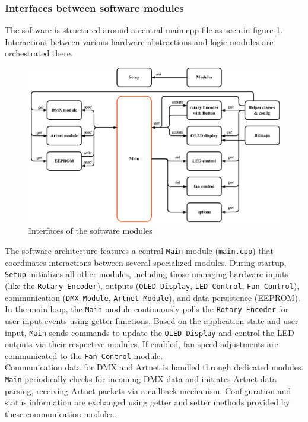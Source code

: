 \subsubsection{Interfaces between software modules}
The software is structured around a central main.cpp file as seen in figure \ref{fig:softwareinterfaces}. 
Interactions between various hardware abstractions and logic modules are orchestrated there.
\begin{figure}[H]
	\centering
	\includegraphics[width=0.95\linewidth]{graphics/software_interfaces}
	\caption{Interfaces of the software modules}
	\label{fig:softwareinterfaces}
\end{figure}
The software architecture features a central \texttt{Main} module (\texttt{main.cpp}) that coordinates interactions between several specialized modules. During startup, \texttt{Setup} initializes all other modules, including those managing hardware inputs (like the \texttt{Rotary Encoder}), outputs (\texttt{OLED Display}, \texttt{LED Control}, \texttt{Fan Control}), communication (\texttt{DMX Module}, \texttt{Artnet Module}), and data persistence (\ac{EEPROM}). \\

In the main loop, the \texttt{Main} module continuously polls the \texttt{Rotary Encoder} for user input events using getter functions. Based on the application state and user input, \texttt{Main} sends commands to update the \texttt{OLED Display} and control the \ac{LED} outputs via their respective modules. If enabled, fan speed adjustments are communicated to the \texttt{Fan Control} module.\\

Communication data for \ac{DMX} and Artnet is handled through dedicated modules. \texttt{Main} periodically checks for incoming \ac{DMX} data and initiates Artnet data parsing, receiving Artnet packets via a callback mechanism. Configuration and status information are exchanged using getter and setter methods provided by these communication modules.\\

